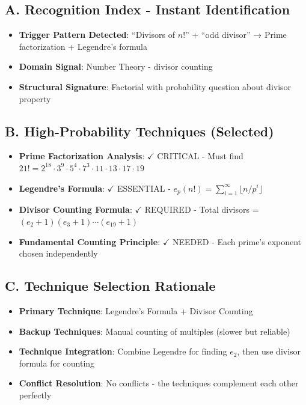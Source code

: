 \documentclass[]{article}
\begin{document}
\begin{techniquesbox}
\subsection*{A. Recognition Index - Instant Identification}
\begin{itemize}[leftmargin=*]
    \item \textbf{Trigger Pattern Detected}: ``Divisors of $n!$'' + ``odd divisor'' → Prime factorization + Legendre's formula
    \item \textbf{Domain Signal}: Number Theory - divisor counting
    \item \textbf{Structural Signature}: Factorial with probability question about divisor property
\end{itemize}

\subsection*{B. High-Probability Techniques (Selected)}
\begin{itemize}[leftmargin=*]
    \item \textbf{Prime Factorization Analysis}: $\checkmark$ CRITICAL - Must find $21! = 2^{18} \cdot 3^9 \cdot 5^4 \cdot 7^3 \cdot 11 \cdot 13 \cdot 17 \cdot 19$
    \item \textbf{Legendre's Formula}: $\checkmark$ ESSENTIAL - $e_p(n!) = \sum_{i=1}^{\infty} \lfloor n/p^i \rfloor$
    \item \textbf{Divisor Counting Formula}: $\checkmark$ REQUIRED - Total divisors = $(e_2+1)(e_3+1) \cdots (e_{19}+1)$
    \item \textbf{Fundamental Counting Principle}: $\checkmark$ NEEDED - Each prime's exponent chosen independently
\end{itemize}

\subsection*{C. Technique Selection Rationale}
\begin{itemize}[leftmargin=*]
    \item \textbf{Primary Technique}: Legendre's Formula + Divisor Counting
    \item \textbf{Backup Techniques}: Manual counting of multiples (slower but reliable)
    \item \textbf{Technique Integration}: Combine Legendre for finding $e_2$, then use divisor formula for counting
    \item \textbf{Conflict Resolution}: No conflicts - the techniques complement each other perfectly
\end{itemize}


\end{techniquesbox}
\end{document}
